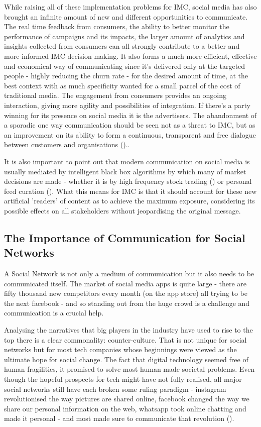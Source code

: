 \documentclass[11pt]{article}
\begin{document}
 While raising all of these implementation problems for IMC, social media has also brought an infinite amount of new and different opportunities to communicate. The real time feedback from consumers, the ability to better monitor the performance of campaigns and its impacts, the larger amount of analytics and insights collected from consumers can all strongly contribute to a better and more informed IMC decision making. It also forms a much more efficient, effective and economical way of communicating since it's delivered only at the targeted people - highly reducing the churn rate - for the desired amount of time, at the best context with as much specificity wanted for a small parcel of the cost of traditional media. The engagement from consumers provides an ongoing interaction, giving more agility and possibilities of integration. If there's a party winning for its presence on social media it is the advertisers. The abandonment of a sporadic one way communication should be seen not as a threat to IMC, but as an improvement on its ability to form a continuous, transparent and free dialogue between customers and organisations (\cite{ananda}).. 
 
It is also important to point out that modern communication on social media is usually mediated by intelligent black box algorithms by which many of market decisions are made - whether it is by high frequency stock trading (\cite{hft}) or personal feed curation (\cite{algo}). What this means for IMC is that it should account for these new artificial 'readers' of content as to achieve the maximum exposure, considering its possible effects on all stakeholders without jeopardising the original message.  

 \subsection{The Importance of Communication for Social Networks}\label{SN}

 A Social Network is not only a medium of communication but it also needs to be communicated itself. The market of social media apps is quite large - there are fifty thousand new competitors every month (on the app store)  all trying to be the next facebook - and so standing out from the huge crowd is a challenge and communication is a crucial help.
 
 Analysing the narratives that big players in the industry have used to rise to the top there is a clear commonality: counter-culture. That is not unique for social networks but for most tech companies whose beginnings were viewed as the ultimate hope for social change. The fact that digital technology seemed free of human fragilities, it promised to solve most human made societal problems. Even though the hopeful prospects for tech might have not fully realised, all major social networks still have each broken some ruling paradigm - instagram revolutionised the way pictures are shared online, facebook changed the way we share our personal information on the web, whatsapp took online chatting and made it personal - and most made sure to communicate that revolution (\cite{evil}).
 
\end{document}
